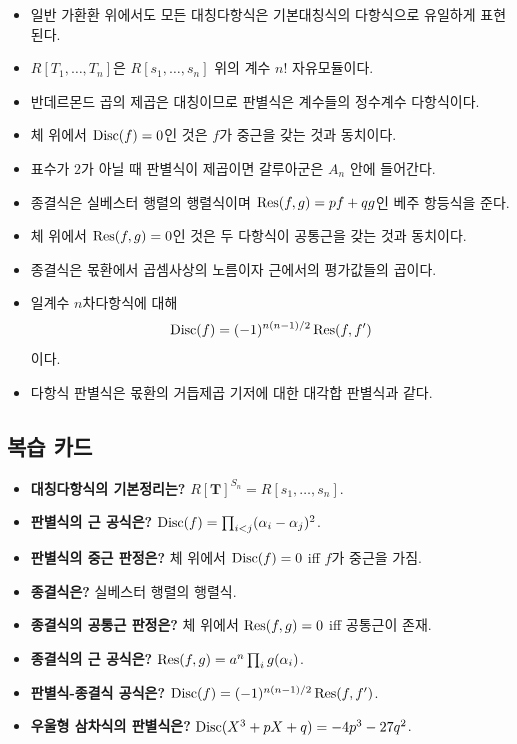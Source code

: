 \begin{chapterreview}
\begin{itemize}
  \item 일반 가환환 위에서도 모든 대칭다항식은 기본대칭식의 다항식으로 유일하게 표현된다.
  \item $R[T_1,\dots,T_n]$은 $R[s_1,\dots,s_n]$ 위의 계수 $n!$ 자유모듈이다.
  \item 반데르몬드 곱의 제곱은 대칭이므로 판별식은 계수들의 정수계수 다항식이다.
  \item 체 위에서 $\operatorname{Disc}(f)=0$인 것은 $f$가 중근을 갖는 것과 동치이다.
  \item 표수가 $2$가 아닐 때 판별식이 제곱이면 갈루아군은 $A_n$ 안에 들어간다.
  \item 종결식은 실베스터 행렬의 행렬식이며 $\operatorname{Res}(f,g)=pf+qg$인 베주 항등식을 준다.
  \item 체 위에서 $\operatorname{Res}(f,g)=0$인 것은 두 다항식이 공통근을 갖는 것과 동치이다.
  \item 종결식은 몫환에서 곱셈사상의 노름이자 근에서의 평가값들의 곱이다.
  \item 일계수 $n$차다항식에 대해
  \[
    \operatorname{Disc}(f)=(-1)^{n(n-1)/2}\operatorname{Res}(f,f')
  \]
  이다.
  \item 다항식 판별식은 몫환의 거듭제곱 기저에 대한 대각합 판별식과 같다.
\end{itemize}
\end{chapterreview}

\subsection*{복습 카드}

\begin{itemize}
  \item \textbf{대칭다항식의 기본정리는?} $R[\mathbf T]^{S_n}=R[s_1,\dots,s_n]$.
  \item \textbf{판별식의 근 공식은?} $\operatorname{Disc}(f)=\prod_{i<j}(\alpha_i-\alpha_j)^2$.
  \item \textbf{판별식의 중근 판정은?} 체 위에서 $\operatorname{Disc}(f)=0$ iff $f$가 중근을 가짐.
  \item \textbf{종결식은?} 실베스터 행렬의 행렬식.
  \item \textbf{종결식의 공통근 판정은?} 체 위에서 $\operatorname{Res}(f,g)=0$ iff 공통근이 존재.
  \item \textbf{종결식의 근 공식은?} $\operatorname{Res}(f,g)=a^n\prod_i g(\alpha_i)$.
  \item \textbf{판별식-종결식 공식은?} $\operatorname{Disc}(f)=(-1)^{n(n-1)/2}\operatorname{Res}(f,f')$.
  \item \textbf{우울형 삼차식의 판별식은?} $\operatorname{Disc}(X^3+pX+q)=-4p^3-27q^2$.
\end{itemize}
